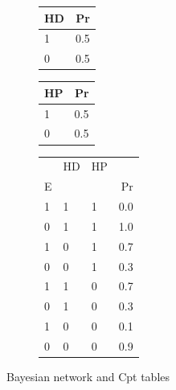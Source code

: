 \documentclass[
  10pt,
  dvipsnames,enabledeprecatedfontcommands]{scrartcl}
\begin{document}
\begin{figure}
\hspace{2cm} \hfill
\hspace{-3cm}\begin{subfigure}[!ht]{0.6\textwidth}

\begin{tabular}{lr}
\toprule
HD & Pr\\
\midrule
1 & 0.5\\
0 & 0.5\\
\bottomrule
\end{tabular}


\begin{tabular}{lr}
\toprule
HP & Pr\\
\midrule
1 & 0.5\\
0 & 0.5\\
\bottomrule
\end{tabular}


\begin{tabular}{lllr}
\toprule
\multicolumn{1}{c}{} & \multicolumn{1}{c}{HD} & \multicolumn{1}{c}{HP} & \multicolumn{1}{c}{} \\
E &  &  & Pr\\
\midrule
1 & 1 & 1 & 0.0\\
0 & 1 & 1 & 1.0\\
1 & 0 & 1 & 0.7\\
0 & 0 & 1 & 0.3\\
1 & 1 & 0 & 0.7\\
0 & 1 & 0 & 0.3\\
1 & 0 & 0 & 0.1\\
0 & 0 & 0 & 0.9\\
\bottomrule
\end{tabular}
\end{subfigure}
\caption{Bayesian network and \textsf{Cpt} tables}
\label{fig:Cpt}
\end{figure}
\end{document}
